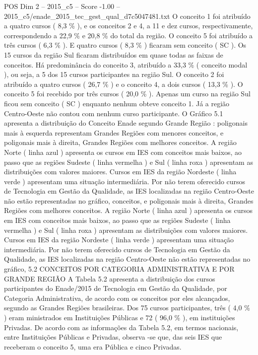 \begin{textsample}{POS Dim 2 – 2015\_c5 – Score -1.00 – 2015\_c5/enade\_2015\_tec\_gest\_qual\_d7c5047481.txt}
O conceito 1 foi atribuído a quatro cursos ( 8,3 \% ), e os conceitos 2 e 4, a 11 e dez cursos, respectivamente, correspondendo a 22,9 \% e 20,8 \% do total da região.
O conceito 5 foi atribuído a três cursos ( 6,3 \% ).
E quatro cursos ( 8,3 \% ) ficaram sem conceito ( SC ).
Os 15 cursos da região Sul ficaram distribuídos em quase todas as faixas de conceitos.
Há predominância do conceito 3, atribuído a 33,3 \% ( conceito modal ), ou seja, a 5 dos 15 cursos participantes na região Sul.
O conceito 2 foi atribuído a quatro cursos ( 26,7 \% ) e o conceito 4, a dois cursos ( 13,3 \% ).
O conceito 5 foi recebido por três cursos ( 20,0 \% ).
Apenas um curso na região Sul ficou sem conceito ( SC ) enquanto nenhum obteve conceito 1.
Já a região Centro-Oeste não contou com nenhum curso participante.
O Gráfico 5.1 apresenta a distribuição do Conceito Enade segundo Grande Região : poligonais mais à esquerda representam Grandes Regiões com menores conceitos, e poligonais mais à direita, Grandes Regiões com melhores conceitos.
A região Norte ( linha azul ) apresenta os cursos em IES com conceitos mais baixos, ao passo que as regiões Sudeste ( linha vermelha ) e Sul ( linha roxa ) apresentam as distribuições com valores maiores.
Cursos em IES da região Nordeste ( linha verde ) apresentam uma situação intermediária.
Por não terem oferecido cursos de Tecnologia em Gestão da Qualidade, as IES localizadas na região Centro-Oeste não estão representadas no gráfico, conceitos, e poligonais mais à direita, Grandes Regiões com melhores conceitos.
A região Norte ( linha azul ) apresenta os cursos em IES com conceitos mais baixos, ao passo que as regiões Sudeste ( linha vermelha ) e Sul ( linha roxa ) apresentam as distribuições com valores maiores.
Cursos em IES da região Nordeste ( linha verde ) apresentam uma situação intermediária.
Por não terem oferecido cursos de Tecnologia em Gestão da Qualidade, as IES localizadas na região Centro-Oeste não estão representadas no gráfico, 5.2 CONCEITOS POR CATEGORIA ADMINISTRATIVA E POR GRANDE REGIÃO A Tabela 5.2 apresenta a distribuição dos cursos participantes do Enade/2015 de Tecnologia em Gestão da Qualidade, por Categoria Administrativa, de acordo com os conceitos por eles alcançados, segundo as Grandes Regiões brasileiras.
Dos 75 cursos participantes, três ( 4,0 \% ) eram ministrados em Instituições Públicas e 72 ( 96,0 \% ), em instituições Privadas.
De acordo com as informações da Tabela 5.2, em termos nacionais, entre Instituições Públicas e Privadas, observa -se que, das seis IES que receberam o conceito 5, uma era Pública e cinco Privadas.

\end{textsample}
